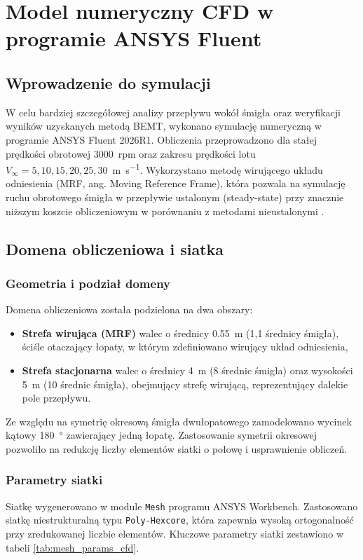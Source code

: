 \documentclass[12pt,a4paper,twoside]{article}
\begin{document}
	\section{Model numeryczny CFD w programie ANSYS Fluent}
	
	\subsection{Wprowadzenie do symulacji}
	W celu bardziej szczegółowej analizy przepływu wokół śmigła oraz weryfikacji wyników uzyskanych metodą BEMT, wykonano symulację numeryczną w programie ANSYS Fluent 2026R1. Obliczenia przeprowadzono dla stałej prędkości obrotowej \SI{3000}{rpm} oraz zakresu prędkości lotu \(V_\infty = 5, 10, 15, 20, 25, 30\)~\si{\meter\per\second}. Wykorzystano metodę wirującego układu odniesienia (MRF, ang. Moving Reference Frame), która pozwala na symulację ruchu obrotowego śmigła w przepływie ustalonym (steady-state) przy znacznie niższym koszcie obliczeniowym w porównaniu z metodami nieustalonymi \cite{mrf_method}.
	
	\subsection{Domena obliczeniowa i siatka}
	
	\subsubsection{Geometria i podział domeny}
	Domena obliczeniowa została podzielona na dwa obszary:
	\begin{itemize}
		\item \textbf{Strefa wirująca (MRF)} walec o średnicy \SI{0.55}{\meter} (1,1 średnicy śmigła), ściśle otaczający łopaty, w którym zdefiniowano wirujący układ odniesienia,
		\item \textbf{Strefa stacjonarna} walec o średnicy \SI{4}{\meter} (8 średnic śmigła) oraz wysokości \SI{5}{\meter} (10 średnic śmigła), obejmujący strefę wirującą, reprezentujący dalekie pole przepływu.
	\end{itemize}
	Ze względu na symetrię okresową śmigła dwułopatowego zamodelowano wycinek kątowy \SI{180}{\degree} zawierający jedną łopatę. Zastosowanie symetrii okresowej pozwoliło na redukcję liczby elementów siatki o połowę i usprawnienie obliczeń.
	
	\subsubsection{Parametry siatki}
	Siatkę wygenerowano w module \texttt{Mesh} programu ANSYS Workbench. Zastosowano siatkę niestrukturalną typu \texttt{Poly-Hexcore}, która zapewnia wysoką ortogonalność przy zredukowanej liczbie elementów. Kluczowe parametry siatki zestawiono w tabeli \ref{tab:mesh_params_cfd}.
	
\end{document}
